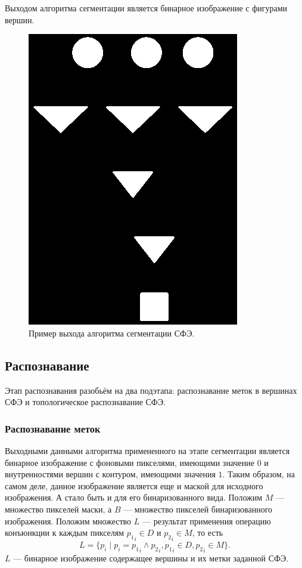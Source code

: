 \documentclass[makeidx, a4paper, 14pt]{extarticle}
\begin{document}
Выходом алгоритма сегментации является бинарное изображение с фигурами вершин.

\begin{figure}[H]
    \centering
    \includegraphics[scale=0.75]{img4_vertices.png}
    \caption{Пример выхода алгоритма сегментации СФЭ.}
\end{figure}


\subsection{Распознавание}
Этап распознавания разобьём на два подэтапа: распознавание меток в вершинах СФЭ и топологическое распознавание СФЭ.

\subsubsection{Распознавание меток}
Выходными данными алгоритма примененного на этапе сегментации является бинарное изображение с
фоновыми пикселями, имеющими значение $0$ и внутренностями вершин с контуром, имеющими значения $1$.
Таким образом, на самом деле, данное изображение является еще и маской для исходного изображения. А стало быть и для
его бинаризованного вида. Положим $M$ --- множество пикселей маски, а $B$ --- множество пикселей бинаризованного изображения.
Положим множество $L$ --- результат применения операцию конъюнкции к каждым пикселям ${{p_1}_i \in D}$ и ${{p_2}_i \in M}$,
то есть \[
    L = \{p_i \mid p_i = {p_1}_i \wedge {p_2}_i, {p_1}_i \in D, {p_2}_i \in M\}.
\]
$L$ --- бинарное изображение содержащее вершины и их метки заданной СФЭ.
\end{document}
